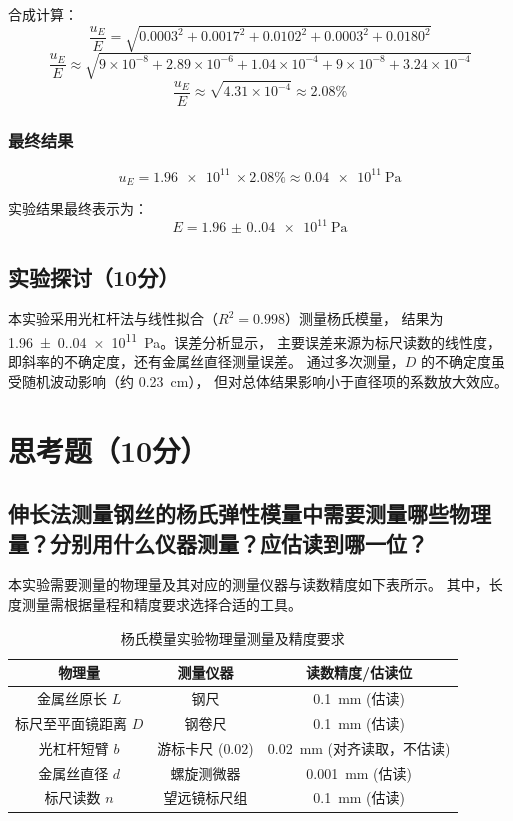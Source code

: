 \documentclass{../template/Report}%
\begin{document}
\begin{fullreportonly}
    合成计算：
    $$ \frac{u_E}{E} = \sqrt{0.0003^2 + 0.0017^2 + 0.0102^2 + 0.0003^2 + 0.0180^2} $$
    $$ \frac{u_E}{E} \approx \sqrt{9 \times 10^{-8} + 2.89 \times 10^{-6} + 1.04 \times 10^{-4} + 9 \times 10^{-8} + 3.24 \times 10^{-4}} $$
    $$ \frac{u_E}{E} \approx \sqrt{4.31 \times 10^{-4}} \approx 2.08\% $$

    \subsubsection{最终结果}
    $$ u_E = \SI{1.96e11}{} \times 2.08\% \approx \SI{0.04e11}{\pascal} $$

    实验结果最终表示为：
    $$ E = \SI{1.96(0.04)e11}{\pascal}$$

    \subsection{实验探讨（10分）}
    本实验采用光杠杆法与线性拟合（$R^2=0.998$）测量杨氏模量，
    结果为 \SI{1.96(0.04)e11}{\pascal}。误差分析显示，
    主要误差来源为标尺读数的线性度，即斜率的不确定度，还有金属丝直径测量误差。
    通过多次测量，$D$ 的不确定度虽受随机波动影响（约 \SI{0.23}{\centi\meter}），
    但对总体结果影响小于直径项的系数放大效应。
    \section{思考题（10分）}
    \subsection{伸长法测量钢丝的杨氏弹性模量中需要测量哪些物理量？分别用什么仪器测量？应估读到哪一位？}

    本实验需要测量的物理量及其对应的测量仪器与读数精度如下表所示。
    其中，长度测量需根据量程和精度要求选择合适的工具。

    \begin{table}[H]
        \centering
        \caption{杨氏模量实验物理量测量及精度要求}
        \begin{tabular}{ccc}
            \toprule
            物理量          & 测量仪器          & 读数精度/估读位                           \\
            \midrule
            金属丝原长 $L$    & 钢尺            & \SI{0.1}{\milli\meter} (估读)        \\
            标尺至平面镜距离 $D$ & 钢卷尺           & \SI{0.1}{\milli\meter} (估读)        \\
            光杠杆短臂 $b$    & 游标卡尺 ($0.02$) & \SI{0.02}{\milli\meter} (对齐读取，不估读) \\
            金属丝直径 $d$    & 螺旋测微器         & \SI{0.001}{\milli\meter} (估读)      \\
            标尺读数 $n$     & 望远镜标尺组        & \SI{0.1}{\milli\meter} (估读)        \\
            \bottomrule
        \end{tabular}
    \end{table}


\end{fullreportonly}
\end{document}
